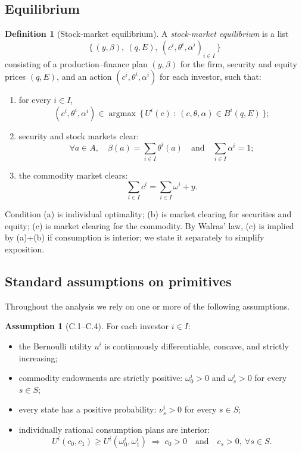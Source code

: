 \documentclass[11pt,a4paper]{article}
\def\geq{\geqslant}
\def\et{\quad \text{and} \quad}
\DeclareMathOperator*{\argmax}{argmax}
\theoremstyle{plain}
\theoremstyle{definition}
\newtheorem{definition}[theorem]{Definition}
\newtheorem{assumption}[theorem]{Assumption}
\theoremstyle{remark}
\begin{document}
\subsection{Equilibrium}

\begin{definition}[Stock-market equilibrium]\label{def:equilibrium}
A \emph{stock-market equilibrium} is a list
\[
  \bigl\{\,(y,\beta),\ (q,E),\ (c^i,\theta^i,\alpha^i)_{i\in I}\,\bigr\}
\]
consisting of a production--finance plan $(y,\beta)$ for the firm, security and equity prices $(q,E)$, and an action $(c^i,\theta^i,\alpha^i)$ for each investor, such that:
\begin{enumerate}
  \item[(a)] for every $i\in I$,
  \[
    (c^i,\theta^i,\alpha^i) \in \argmax\,\bigl\{\,U^i(c)\ :\ (c,\theta,\alpha)\in B^i(q,E)\,\bigr\};
  \]
  \item[(b)] security and stock markets clear:
  \[
    \forall a\in A,\quad \beta(a) = \sum_{i\in I}\theta^i(a)
    \et
    \sum_{i\in I}\alpha^i = 1;
  \]
  \item[(c)] the commodity market clears:
  \[
    \sum_{i\in I} c^i = \sum_{i\in I}\omega^i + y.
  \]
\end{enumerate}
\end{definition}

Condition (a) is individual optimality; (b) is market clearing for securities and equity; (c) is market clearing for the commodity. By Walras' law, (c) is implied by (a)+(b) if consumption is interior; we state it separately to simplify exposition.

\subsection{Standard assumptions on primitives}

Throughout the analysis we rely on one or more of the following assumptions.

\begin{assumption}[C.1--C.4]\label{ass:C}\mbox{}
For each investor $i\in I$:
\begin{itemize}
  \item[\textup{(C.1)}] the Bernoulli utility $u^i$ is continuously differentiable, concave, and strictly increasing;
  \item[\textup{(C.2)}] commodity endowments are strictly positive: $\omega^i_0>0$ and $\omega^i_s>0$ for every $s\in S$;
  \item[\textup{(C.3)}] every state has a positive probability: $\nu^i_s>0$ for every $s\in S$;
  \item[\textup{(C.4)}] individually rational consumption plans are interior:
  \[
    U^i(c_0,c_1) \geq U^i(\omega^i_0,\omega^i_1)
    \;\Longrightarrow\;
    c_0>0 \et c_s>0,\ \forall s\in S.
  \]
\end{itemize}
\end{assumption}
\end{document}
